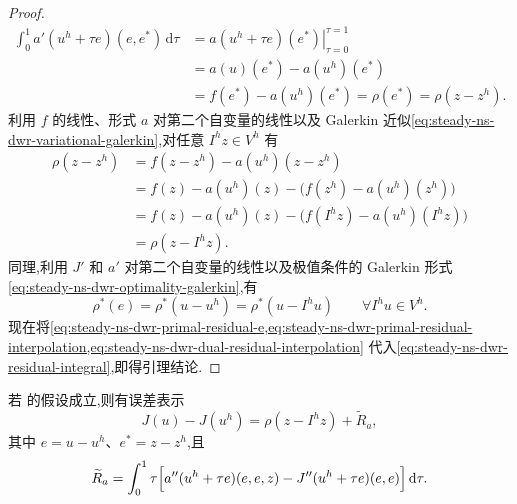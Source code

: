 \begin{proof}
\begin{equation}
\begin{aligned}
  \int_0^1a'(u^h+\tau e)(e,e^*)\,\mathrm{d}\tau
   &=\left.a(u^h+\tau e)(e^*)\right|_{\tau=0}^{\tau=1}\\
   &=a(u)(e^*)-a(u^h)(e^*)\\
   &=f(e^*)-a(u^h)(e^*)=\rho(e^*)=\rho(z-z^h).
\end{aligned}
\end{equation}
利用 $f$ 的线性、形式 $a$ 对第二个自变量的线性以及 Galerkin 近似\cref{eq:steady-ns-dwr-variational-galerkin},对任意 $I^h z\in V^h$ 有
\begin{equation}\label{eq:steady-ns-dwr-primal-residual-interpolation}
\begin{aligned}
  \rho(z-z^h)
   &=f(z-z^h)-a(u^h)(z-z^h)\\
   &=f(z)-a(u^h)(z)-\bigl(f(z^h)-a(u^h)(z^h)\bigr)\\
   &=f(z)-a(u^h)(z)-\bigl(f(I^h z)-a(u^h)(I^h z)\bigr)\\
   &=\rho(z-I^h z).
\end{aligned}
\end{equation}
同理,利用 $J'$ 和 $a'$ 对第二个自变量的线性以及极值条件的 Galerkin 形式\cref{eq:steady-ns-dwr-optimality-galerkin},有
\begin{equation}\label{eq:steady-ns-dwr-dual-residual-interpolation}
  \rho^*(e)=\rho^*(u-u^h)=\rho^*(u-I^h u)
  \qquad \forall I^h u\in V^h.
\end{equation}
现在将\cref{eq:steady-ns-dwr-primal-residual-e,eq:steady-ns-dwr-primal-residual-interpolation,eq:steady-ns-dwr-dual-residual-interpolation} 代入\cref{eq:steady-ns-dwr-residual-integral},即得引理结论.
\end{proof}

\begin{theorem}[仅含原问题残量和二次余项的误差表示]\label{thm:steady-ns-dwr-primal-only}
若 的假设成立,则有误差表示
\begin{equation}\label{eq:steady-ns-dwr-primal-only}
  J(u)-J(u^h)=\rho(z-I^h z)+\widetilde R_a,
\end{equation}
其中 $e=u-u^h$、$e^*=z-z^h$,且
\[
  \widetilde R_a=\int_0^1\tau\Bigl[
    a''(u^h+\tau e)(e,e,z)
    -J''(u^h+\tau e)(e,e)\Bigr]\,\mathrm{d}\tau.
\]
\end{theorem}

